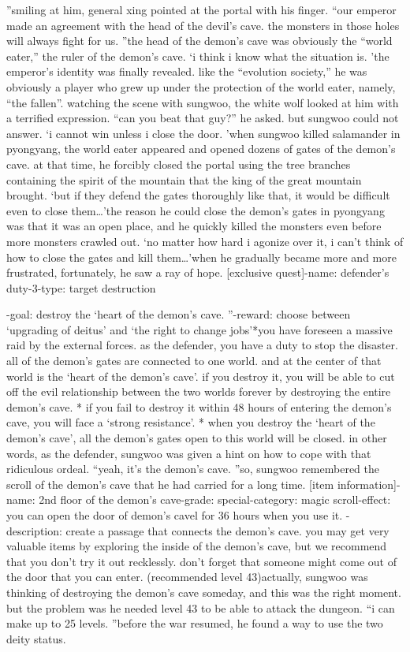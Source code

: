 ”smiling at him, general xing pointed at the portal with his finger.
“our emperor made an agreement with the head of the devil’s cave.
 the monsters in those holes will always fight for us.
”the head of the demon’s cave was obviously the “world eater,” the ruler of the demon’s cave.
‘i think i know what the situation is.
’the emperor’s identity was finally revealed.
 like the “evolution society,” he was obviously a player who grew up under the protection of the world eater, namely, “the fallen”.
watching the scene with sungwoo, the white wolf looked at him with a terrified expression.
“can you beat that guy?” he asked.
but sungwoo could not answer.
‘i cannot win unless i close the door.
’when sungwoo killed salamander in pyongyang, the world eater appeared and opened dozens of gates of the demon’s cave.
at that time, he forcibly closed the portal using the tree branches containing the spirit of the mountain that the king of the great mountain brought.
‘but if they defend the gates thoroughly like that, it would be difficult even to close them…’the reason he could close the demon’s gates in pyongyang was that it was an open place, and he quickly killed the monsters even before more monsters crawled out.
‘no matter how hard i agonize over it, i can’t think of how to close the gates and kill them…’when he gradually became more and more frustrated, fortunately, he saw a ray of hope.
[exclusive quest]-name: defender’s duty-3-type: target destruction

-goal: destroy the ‘heart of the demon’s cave.
”-reward: choose between ‘upgrading of deitus’ and ‘the right to change jobs’*you have foreseen a massive raid by the external forces.
 as the defender, you have a duty to stop the disaster.
 all of the demon’s gates are connected to one world.
 and at the center of that world is the ‘heart of the demon’s cave’.
 if you destroy it, you will be able to cut off the evil relationship between the two worlds forever by destroying the entire demon’s cave.
* if you fail to destroy it within 48 hours of entering the demon’s cave, you will face a ‘strong resistance’.
* when you destroy the ‘heart of the demon’s cave’, all the demon’s gates open to this world will be closed.
in other words, as the defender, sungwoo was given a hint on how to cope with that ridiculous ordeal.
“yeah, it’s the demon’s cave.
”so, sungwoo remembered the scroll of the demon’s cave that he had carried for a long time.
[item information]-name: 2nd floor of the demon’s cave-grade: special-category: magic scroll-effect: you can open the door of demon’s cavel for 36 hours when you use it.
-description: create a passage that connects the demon’s cave.
 you may get very valuable items by exploring the inside of the demon’s cave, but we recommend that you don’t try it out recklessly.
 don’t forget that someone might come out of the door that you can enter.
 (recommended level 43)actually, sungwoo was thinking of destroying the demon’s cave someday, and this was the right moment.
but the problem was he needed level 43 to be able to attack the dungeon.
“i can make up to 25 levels.
”before the war resumed, he found a way to use the two deity status.


 